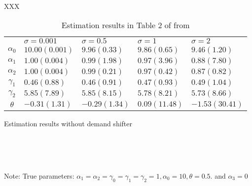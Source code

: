 \documentclass[11pt, a4paper]{article}
\begin{document}
XXX

\appendix


\begin{table}[!htbp]
    \centering
    \caption{Estimation results in Table 2 of from \cite{perloff2012collinearity}}
    \label{tb:linear_linear_sigma_Perloff_Shen} 
        \begin{tabular}{cllll}
            \hline\hline
            & $\sigma=0.001$ & $\sigma=0.5$ & $\sigma=1$ & $\sigma=2$ \\
            $\alpha_0$ & $10.00(0.001)$ & $9.96(0.33)$ & $9.86(0.65)$ & $9.46(1.20)$ \\
            $\alpha_1$ & $1.00(0.004)$ & $0.99(1.98)$ & $0.97(3.96)$ & $0.88(7.80)$ \\
            $\alpha_2$ & $1.00(0.004)$ & $0.99(0.21)$ & $0.97(0.42)$ & $0.87(0.82)$ \\
            $\gamma_1$ & $0.46(0.88)$ & $0.46(0.91)$ & $0.47(0.93)$ & $0.49(1.04)$ \\
            $\gamma_2$ & $5.85(7.89)$ & $5.85(8.15)$ & $5.78(8.21)$ & $5.73(8.66)$ \\
            $\theta$ & $-0.31(1.31)$ & $-0.29(1.34)$ & $0.09(11.48)$ & $-1.53(30.41)$ \\
            \hline
        \end{tabular}
\end{table}


\begin{table}[!htbp]
  \begin{center}
      \caption{Estimation results without demand shifter}
      \label{tb:linear_linear_sigma_1_without_demand_shifter_y} 
      \subfloat[$\sigma=0.001$]{}\\
      \subfloat[$\sigma=0.5$]{}\\
      \subfloat[$\sigma=1.0$]{}\\
    \subfloat[$\sigma=2.0$]{}
  \end{center}\footnotesize
  Note: True parameters: $\alpha_1 = \alpha_2 =  \gamma_0 = \gamma_1 = \gamma_2  =  1, \alpha_0 = 10, \theta = 0.5.$ and $\alpha_3 =0$
\end{table} 
\end{document}
